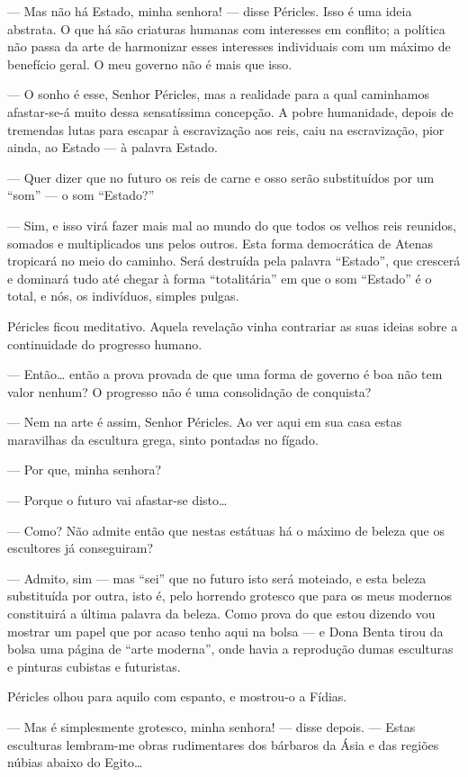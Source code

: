 --- Mas não há Estado, minha senhora! --- disse Péricles. Isso é uma
ideia abstrata. O que há são criaturas humanas com interesses em
conflito; a política não passa da arte de harmonizar esses interesses
individuais com um máximo de benefício geral. O meu governo não é mais
que isso.

--- O sonho é esse, Senhor Péricles, mas a realidade para a qual
caminhamos afastar-se-á muito dessa sensatíssima concepção. A pobre
humanidade, depois de tremendas lutas para escapar à escravização aos
reis, caiu na escravização, pior ainda, ao Estado --- à palavra Estado.

--- Quer dizer que no futuro os reis de carne e osso serão substituídos
por um ``som'' --- o som ``Estado?''

--- Sim, e isso virá fazer mais mal ao mundo do que todos os velhos reis
reunidos, somados e multiplicados uns pelos outros. Esta forma
democrática de Atenas tropicará no meio do caminho. Será destruída pela
palavra ``Estado'', que crescerá e dominará tudo até chegar à forma
``totalitária'' em que o som ``Estado'' é o total, e nós, os indivíduos,
simples pulgas.

Péricles ficou meditativo. Aquela revelação vinha contrariar as suas
ideias sobre a continuidade do progresso humano.

--- Então\ldots{} então a prova provada de que uma forma de governo é
boa não tem valor nenhum? O progresso não é uma consolidação de
conquista?

--- Nem na arte é assim, Senhor Péricles. Ao ver aqui em sua casa estas
maravilhas da escultura grega, sinto pontadas no fígado.

--- Por que, minha senhora?

--- Porque o futuro vai afastar-se disto\ldots{}

--- Como? Não admite então que nestas estátuas há o máximo de beleza que
os escultores já conseguiram?

--- Admito, sim --- mas ``sei'' que no futuro isto será moteiado, e esta
beleza substituída por outra, isto é, pelo horrendo grotesco que para os
meus modernos constituirá a última palavra da beleza. Como prova do que
estou dizendo vou mostrar um papel que por acaso tenho aqui na bolsa ---
e Dona Benta tirou da bolsa uma página de ``arte moderna'', onde havia a
reprodução dumas esculturas e pinturas cubistas e futuristas.

Péricles olhou para aquilo com espanto, e mostrou-o a Fídias.

--- Mas é simplesmente grotesco, minha senhora! --- disse depois. ---
Estas esculturas lembram-me obras rudimentares dos bárbaros da Ásia e
das regiões núbias abaixo do Egito\ldots{}


